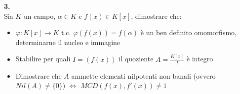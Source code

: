 \documentclass[italian,a4paper,11pt]
{article}
\newcommand{\acc}{\`}
\begin{document}
\vspace{0.4 cm}
\noindent
\begin{Ex}\textbf{ 3.}\\
Sia $K$ un campo, $\alpha \in K$ e $f(x) \in K[x]$, dimostrare che:
\begin{itemize}
\item $\varphi: K[x] \longrightarrow K $ t.c. $\varphi (f(x))=f(\alpha)$ \acc e un ben definito omomorfismo, determinarne il nucleo e immagine
\item Stabilire per quali $I=\left(f(x)\right)$ il quoziente $A=\frac{K[x]}{I}$ \acc e integro
\item Dimostrare che $A$ ammette elementi nilpotenti non banali (ovvero $Nil(A)\neq \{0\}$) $\iff $ $MCD(f(x),f'(x))\neq 1$
\end{itemize}
\end{Ex}
\end{document}
